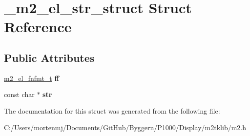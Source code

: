 \hypertarget{struct__m2__el__str__struct}{\section{\-\_\-m2\-\_\-el\-\_\-str\-\_\-struct Struct Reference}
\label{struct__m2__el__str__struct}
}
\subsection*{Public Attributes}
\begin{DoxyCompactItemize}
\item 
\hypertarget{struct__m2__el__str__struct_a982766f7086fd93874a1e08a377bb7ed}{\hyperlink{struct__m2__el__fnfmt__struct}{m2\-\_\-el\-\_\-fnfmt\-\_\-t} {\bfseries ff}}\label{struct__m2__el__str__struct_a982766f7086fd93874a1e08a377bb7ed}

\item 
\hypertarget{struct__m2__el__str__struct_a5ed192b956bee13770df66baac24e386}{const char $\ast$ {\bfseries str}}\label{struct__m2__el__str__struct_a5ed192b956bee13770df66baac24e386}

\end{DoxyCompactItemize}


The documentation for this struct was generated from the following file\-:\begin{DoxyCompactItemize}
\item 
C\-:/\-Users/mortenmj/\-Documents/\-Git\-Hub/\-Byggern/\-P1000/\-Display/m2tklib/m2.\-h\end{DoxyCompactItemize}
